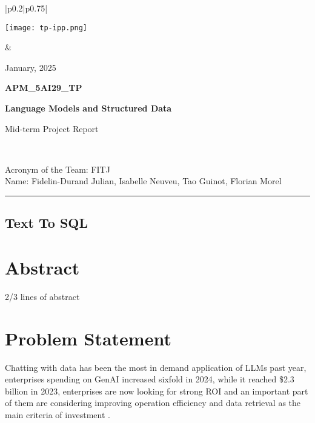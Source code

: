 \documentclass[12pt,a4paper]{article}
\begin{document}
\begin{center}
  \begin{tabular}{|p{0.2\textwidth}|p{0.75\textwidth}|}
    \hline
    {
    \vspace{0cm} %
    \centerline{\texttt{[image: tp-ipp.png]}}
    }
    & {
      \vspace{0cm} %
      \centering
      \large
      {\hfill January, 2025}
      
      \vspace*{.5cm}
      \textbf{APM\_5AI29\_TP}
      
      \vspace*{.5cm}
      {\Large\textbf{Language Models and Structured Data}}
      
      \vspace*{.5cm}
      Mid-term Project Report

      \vspace*{1cm}
      } \\
    \hline
  \end{tabular}
\end{center}

\noindent Acronym of the Team: FITJ\\
Name:	Fidelin-Durand Julian, Isabelle Neuveu, Tao Guinot, Florian Morel

{\centering\rule{\linewidth}{.5pt}}


\begin{center}
\section*{Text To SQL}
\end{center}
\section*{Abstract}

2/3 lines of abstract

\section*{Problem Statement}

Chatting with data has been the most in demand application of LLMs past year, enterprises spending on GenAI increased sixfold in 2024, while it reached \$2.3 billion in 2023, enterprises are now looking for strong ROI and an important part of them are considering improving operation efficiency and data retrieval as the main criteria of investment \cite{MarketAnalysis} \cite{DeloitteResearch}.
\end{document}
